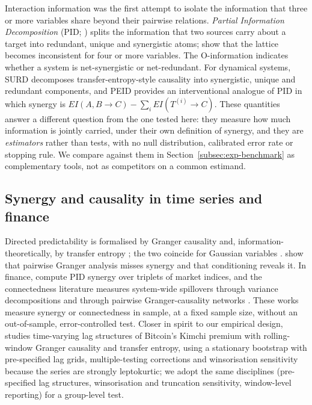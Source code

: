 \documentclass[pdflatex,sn-mathphys-ay]{sn-jnl}%
\theoremstyle{thmstyleone}%
\theoremstyle{thmstyletwo}%
\theoremstyle{thmstylethree}%
\begin{document}
Interaction information \citep{mcgill1954} was the first attempt to isolate the
information that three or more variables share beyond their pairwise relations.
\emph{Partial Information Decomposition} (PID; \citealp{williams2010}) splits the
information that two sources carry about a target into redundant, unique and synergistic
atoms; \citet{lyu2026} show that the lattice becomes inconsistent for four or more
variables. The O-information \citep{rosas2019} indicates whether a system is net-synergistic
or net-redundant. For dynamical systems, SURD \citep{surd2024} decomposes
transfer-entropy-style causality into synergistic, unique and redundant components, and
PEID \citep{peid2026} provides an interventional analogue of PID in which synergy is
$EI(A,B\!\to\!C)-\sum_i EI(T^{(i)}\!\to\!C)$. These quantities answer a different question
from the one tested here: they measure how much information is jointly carried, under
their own definition of synergy, and they are \emph{estimators} rather than tests, with
no null distribution, calibrated error rate or stopping rule. We compare against them in
Section~\ref{subsec:exp-benchmark} as complementary tools, not as competitors on a common
estimand.

\subsection{Synergy and causality in time series and finance}\label{subsec:tsfin}

Directed predictability is formalised by Granger causality \citep{granger1969,geweke1982}
and, information-theoretically, by transfer entropy \citep{schreiber2000}; the two coincide
for Gaussian variables \citep{barnett2009}. \citet{stramaglia2014} show that pairwise
Granger analysis misses synergy and that conditioning reveals it. In finance,
\citet{scagliarini2020} compute PID synergy over triplets of market indices, and the
connectedness literature measures system-wide spillovers through variance decompositions
\citep{diebold2014} and through pairwise Granger-causality networks \citep{billio2012}.
These works measure synergy or connectedness in sample, at a fixed sample size, without an
out-of-sample, error-controlled test. Closer in spirit to our empirical design, \citet{choi2026} studies time-varying lag structures of Bitcoin's Kimchi premium with rolling-window Granger causality and transfer entropy, using a stationary bootstrap with pre-specified lag grids, multiple-testing corrections and winsorisation sensitivity because the series are strongly leptokurtic; we adopt the same disciplines (pre-specified lag structures, winsorisation and truncation sensitivity, window-level reporting) for a group-level test.
\end{document}
